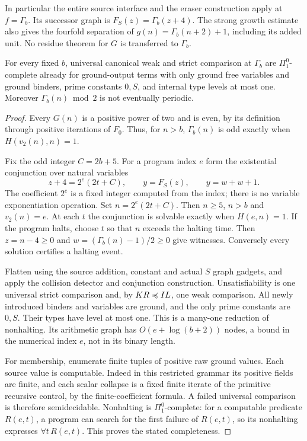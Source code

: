 In particular the entire source interface and the eraser construction
apply at $f=\Gamma_b$. Its successor graph is
$F_S(z)=\Gamma_b(z+4)$. The strong growth estimate also gives the
fourfold separation of $g(n)=\Gamma_b(n+2)+1$, including its added
unit. No residue theorem for $G$ is transferred to $\Gamma_b$.

\begin{theorem}
\label{thm:control-hardness}
For every fixed $b$, universal canonical weak and strict comparison at
$\Gamma_b$ are $\Pi^0_1$-complete already for ground-output terms
with only ground free variables and ground binders, prime constants
$0,S$, and internal type levels at most one.
Moreover $\Gamma_b(n)\bmod2$ is not eventually periodic.
\end{theorem}
\begin{proof}
Every $G(n)$ is a positive power of two and is even, by its
definition through positive iterations of $F_0$. Thus, for $n>b$,
$\Gamma_b(n)$ is odd exactly when $H(v_2(n),n)=1$.

Fix the odd integer $C=2b+5$. For a program index $e$ form the
existential conjunction over natural variables
\[
 z+4=2^e(2t+C),\qquad y=F_S(z),\qquad y=w+w+1.
\]
The coefficient $2^e$ is a fixed integer computed from the index;
there is no variable exponentiation operation. Set
$n=2^e(2t+C)$. Then $n\ge5$, $n>b$ and $v_2(n)=e$.
At each $t$ the conjunction is solvable exactly when $H(e,n)=1$.
If the program halts, choose $t$ so that $n$ exceeds the halting
time. Then $z=n-4\ge0$ and $w=(\Gamma_b(n)-1)/2\ge0$
give witnesses. Conversely every solution certifies a halting event.

Flatten using the source addition, constant and actual $S$ graph
gadgets, and apply the collision detector and conjunction construction.
Unsatisfiability is one universal strict comparison and, by $KR\preccurlyeq IL$,
one weak comparison. All newly introduced binders and variables are
ground, and the only prime constants are $0,S$. Their types have
level at most one. This is a many-one reduction of nonhalting. Its
arithmetic graph has $O(e+\log(b+2))$ nodes, a bound in the numerical
index $e$, not in its binary length.

For membership, enumerate finite tuples of positive raw ground
values. Each source value is computable. Indeed in this restricted
grammar its positive fields are finite, and each scalar collapse is
a fixed finite iterate of the primitive recursive control, by the
finite-coefficient formula. A failed universal comparison is therefore
semidecidable. Nonhalting is $\Pi^0_1$-complete: for a computable
predicate $R(e,t)$, a program can search for the first failure of
$R(e,t)$, so its nonhalting expresses $\forall t\,R(e,t)$.
This proves the stated completeness.


\end{proof}
